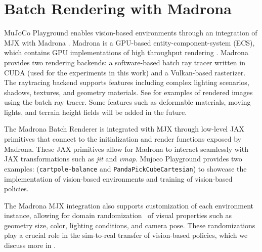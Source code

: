 \section{Batch Rendering with Madrona}
\label{sec:madrona}

MuJoCo Playground enables vision-based environments through an integration of MJX with Madrona \cite{shacklett23madrona}. Madrona is a GPU-based entity-component-system (ECS), which contains GPU implementations of high throughput rendering \cite{rosenzweig24madronarenderer}. Madrona provides two rendering backends: a software-based batch ray tracer written in CUDA (used for the experiments in this work) and a Vulkan-based rasterizer. The raytracing backend supports features including complex lighting scenarios, shadows, textures, and geometry materials. See  for examples of rendered images using the batch ray tracer. Some features such as deformable materials, moving lights, and terrain height fields will be added in the future.

The Madrona Batch Renderer is integrated with MJX through low-level JAX \cite{jax2018github} primitives that connect to the initialization and render functions exposed by Madrona. These JAX primitives allow for Madrona to interact seamlessly with JAX transformations such as \textit{jit} and \textit{vmap}. Mujoco Playground provides two examples: (\texttt{cartpole-balance} and \texttt{PandaPickCubeCartesian}) to showcase the implementation of vision-based environments and training of vision-based policies.

The Madrona MJX integration also supports customization of each environment instance, allowing for domain randomization~\cite{domainrand2017} of visual properties such as geometry size, color, lighting conditions, and camera pose. These randomizations play a crucial role in the sim-to-real transfer of vision-based policies, which we discuss more in .

